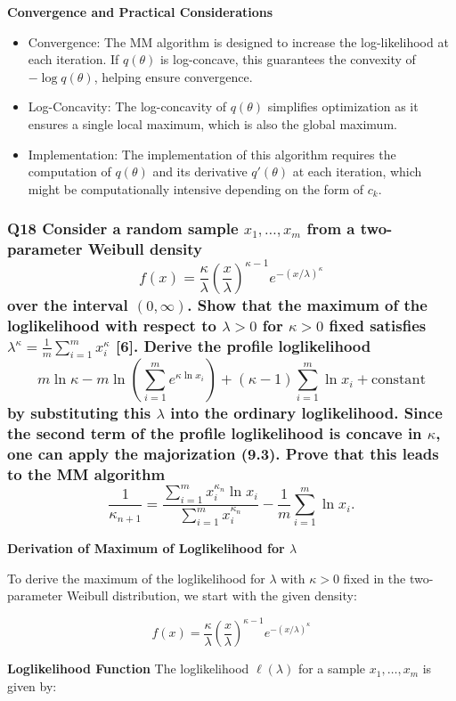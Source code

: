 \documentclass[8pt]{article}
\begin{document}
\textbf{Convergence and Practical Considerations}
\begin{itemize}
    \item Convergence: The MM algorithm is designed to increase the log-likelihood at each iteration. If \(q(\theta)\) is log-concave, this guarantees the convexity of \(-\log q(\theta)\), helping ensure convergence.
    \item Log-Concavity: The log-concavity of \(q(\theta)\) simplifies optimization as it ensures a single local maximum, which is also the global maximum.
    \item Implementation: The implementation of this algorithm requires the computation of \(q(\theta)\) and its derivative \(q'(\theta)\) at each iteration, which might be computationally intensive depending on the form of \(c_k\).
\end{itemize}


\subsubsection*{Q18 Consider a random sample \( x_1, \ldots, x_m \) from a two-parameter Weibull density
\[
f(x) = \frac{\kappa}{\lambda} \left( \frac{x}{\lambda} \right)^{\kappa - 1} e^{-(x / \lambda)^\kappa}
\]
over the interval \((0, \infty)\). Show that the maximum of the loglikelihood with respect to \(\lambda > 0\) for \(\kappa > 0\) fixed satisfies \(\lambda^\kappa = \frac{1}{m} \sum_{i=1}^m x_i^\kappa\) [6]. Derive the profile loglikelihood
\[
m \ln \kappa - m \ln \left( \sum_{i=1}^m e^{\kappa \ln x_i} \right) + (\kappa - 1) \sum_{i=1}^m \ln x_i + \text{constant}
\]
by substituting this \(\lambda\) into the ordinary loglikelihood. Since the second term of the profile loglikelihood is concave in \(\kappa\), one can apply the majorization (9.3). Prove that this leads to the MM algorithm
\[
\frac{1}{\kappa_{n+1}} = \frac{\sum_{i=1}^m x_i^{\kappa_n} \ln x_i}{\sum_{i=1}^m x_i^{\kappa_n}} - \frac{1}{m} \sum_{i=1}^m \ln x_i.
\]}

\textbf{Derivation of Maximum of Loglikelihood for \(\lambda\)}

To derive the maximum of the loglikelihood for \(\lambda\) with \(\kappa > 0\) fixed in the two-parameter Weibull distribution, we start with the given density:

\[
f(x) = \frac{\kappa}{\lambda} \left( \frac{x}{\lambda} \right)^{\kappa - 1} e^{-(x / \lambda)^\kappa}
\]

\textbf{Loglikelihood Function}
The loglikelihood \(\ell(\lambda)\) for a sample \(x_1, \ldots, x_m\) is given by:
\end{document}
